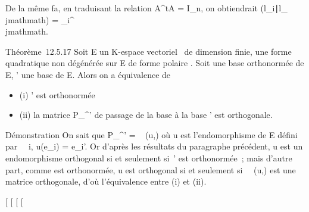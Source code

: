 \documentclass[]{article}
\begin{document}
De la même fa\ccon, en traduisant la relation
A^tA = I_n, on obtiendrait
(l_i∣l_\\jmathmath) =
\delta_i^\\jmathmath.

Théorème~12.5.17 Soit E un K-espace vectoriel ~de dimension finie, \Phi une
forme quadratique non dégénérée sur E de forme polaire \phi. Soit  une
base orthonormée de E, ' une base de E. Alors on a équivalence de

\begin{itemize}
\itemsep1pt\parskip0pt
\item
  (i) ' est orthonormée
\item
  (ii) la matrice P_^' de passage de la base  à la
  base ' est orthogonale.
\end{itemize}

Démonstration On sait que P_^'
= \mathrmMat~ (u,) où u est
l'endomorphisme de E défini par \forall~~i,
u(e_i) = e_i'. Or d'après les résultats du paragraphe
précédent, u est un endomorphisme orthogonal si et seulement si~' est
orthonormée~; mais d'autre part, comme  est orthonormée, u est
orthogonal si et seulement
si~\mathrmMat~ (u,) est une
matrice orthogonale, d'où l'équivalence entre (i) et (ii).

{[}
{[}
{[}
{[}
\end{document}
